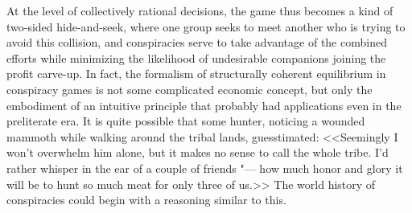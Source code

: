 At the level of collectively rational decisions, the game thus becomes a kind of two-sided hide-and-seek, where one group seeks to meet another who is trying to avoid this collision, and conspiracies serve to take advantage of the combined efforts while minimizing the likelihood of undesirable companions joining the profit carve-up. In fact, the formalism of structurally coherent equilibrium in conspiracy games is not some complicated economic concept, but only the embodiment of an intuitive principle that probably had applications even in the preliterate era. It is quite possible that some hunter, noticing a wounded mammoth while walking around the tribal lands, guesstimated: <<Seemingly I won’t overwhelm him alone, but it makes no sense to call the whole tribe. I'd rather whisper in the ear of a couple of friends "--- how much honor and glory it will be to hunt so much meat for only three of us.>> The world history of conspiracies could begin with a reasoning similar to this. %

\FloatBarrier
